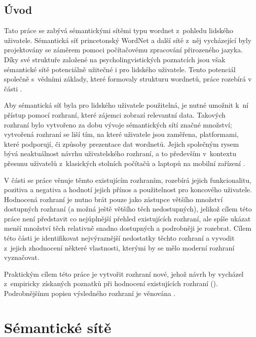\documentclass[a4paper, 11pt, oneside, showtrims]{book}
\newcommand{\itNameRef}[1]{\textit{\nameref{#1}}}
\begin{document}
	\newpage

	\chapter*{Úvod}\label{uvod}


		Tato práce se zabývá sémantickými sítěmi typu wordnet z~pohledu lidského uživatele. Sémantická síť princetonský WordNet a další sítě z~něj vycházející byly projektovány se záměrem pomoci počítačovému zpracování přirozeného jazyka. Díky své struktuře založené na psycholingvistických poznatcích jsou však sémantické sítě potenciálně užitečné i pro lidského uživatele. Tento potenciál společně s~vědními základy, které formovaly strukturu wordnetů, práce rozebírá v části \itNameRef{part:eins}.

		Aby sémantická síť byla pro lidského uživatele použitelná, je nutné umožnit k~ní přístup pomocí rozhraní, které zájemci zobrazí relevantní data. Takových rozhraní bylo vytvořeno za dobu vývoje sémantických sítí značné množství; vytvořená rozhraní se liší tím, na které uživatele jsou zaměřena, platformami, které podporují, či způsoby prezentace dat wordnetů. Jejich společným rysem bývá neaktuálnost návrhu uživatelského rozhraní, a to především v~kontextu přesunu uživatelů z~klasických stolních počítačů a laptopů na mobilní zařízení  \parencite{grace2013mobile}.

		V části \itNameRef{part:zwei} se práce věnuje těmto existujícím rozhraním, rozebírá jejich funkcionalitu, pozitiva a negativa a hodnotí jejich přínos a použitelnost pro koncového uživatele. Hodnocená rozhraní je nutno brát pouze jako zástupce většího množství dostupných rozhraní (a možná ještě většího těch nedostupných), jelikož cílem této práce není představit co nejúplnější přehled existujících rozhraní, ale spíše ukázat menší množství těch relativně snadno dostupných a podrobněji je rozebrat. Cílem této části je identifikovat nejvýraznější nedostatky těchto rozhraní a vyvodit z~jejich zhodnocení některé vlastnosti, kterými by se mělo moderní rozhraní vyznačovat. 

		Praktickým cílem této práce je vytvořit rozhraní nové, jehož návrh by vycházel z~empiricky získaných poznatků při hodnocení existujících rozhraní (\itNameRef{part:zwei}). Podrobnějšímu popisu výsledného rozhraní je věnována \itNameRef{part:drei}.

	\newpage

	\part{Sémantické sítě}
	\label{part:eins}
\end{document}
